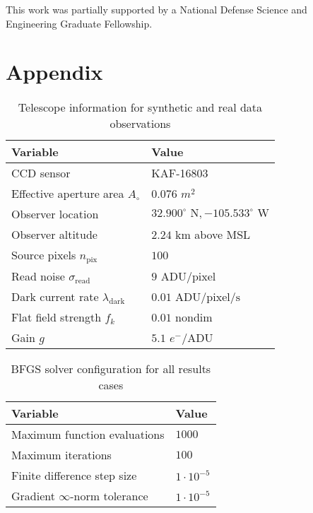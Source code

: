 \documentclass[a4paper,twocolumn]{spaceDebrisC} %
\begin{document}
This work was partially supported by a National Defense Science and Engineering Graduate Fellowship.

\section*{Appendix}

\begin{table}[H]
  \centering
  \caption{Telescope information for synthetic and real data observations}
  \vspace*{6pt}
  \begin{tabular}{|l|l|}
  \hline
  \textbf{Variable} & \textbf{Value} \\ \hline
 CCD sensor & KAF-16803 \\ \hline
 Effective aperture area $A_\circ$ & $0.076$ $m^2$ \\ \hline
 Observer location & $32.900^\circ \textrm{ N}, -105.533^\circ \textrm{ W}$ \\ \hline
 Observer altitude & $2.24$ km above MSL \\ \hline
 Source pixels $n_\text{pix}$ & $100$ \\ \hline
 Read noise $\sigma_\text{read}$ & $9$ $\text{ADU} / \text{pixel}$ \\ \hline
 Dark current rate $\lambda_\text{dark}$ & $0.01$ $\text{ADU} / \text{pixel} / \text{s}$ \\ \hline
 Flat field strength $f_k$ & $0.01$ nondim \\ \hline
 Gain $g$ & $5.1$ $e^- / \text{ADU}$ \\ \hline
  \end{tabular}
  \label{tb:tele_info}
 \end{table}

 \begin{table}[H]
  \centering
  \caption{BFGS solver configuration for all results cases}
  \vspace*{6pt}
  \begin{tabular}{|l|l|}
  \hline
  \textbf{Variable} & \textbf{Value} \\ \hline
 Maximum function evaluations & $1000$ \\ \hline
 Maximum iterations & $100$ \\ \hline
 Finite difference step size & $1 \cdot 10^{-5}$ \\ \hline
 Gradient $\infty$-norm tolerance & $1 \cdot 10^{-5}$ \\ \hline
  \end{tabular}
  \label{tb:bfgs_info}
 \end{table}


\end{document}
